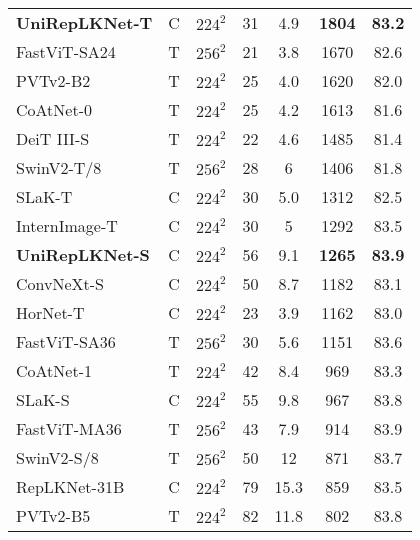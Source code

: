 \documentclass[10pt,twocolumn,letterpaper]{article}
\begin{document}
\begin{table}[t!]
\begin{tabular}{l|c|c|c|c|c|c}
    \textbf{UniRepLKNet-T}   &   C   &   $224^2$     &   31    &   4.9    &   \textbf{1804}   &   \textbf{83.2}    \\
    FastViT-SA24~\cite{vasu2023fastvit}      &   T   &   $256^2$   &   21    &   3.8    &   1670    &   82.6    \\
    PVTv2-B2~\cite{wang2022pvt} & T & $224^2$  & 25 & 4.0     &   1620    & 82.0 \\
    CoAtNet-0~\cite{dai2021coatnet} & T &$224^2$ & 25 & 4.2 &   1613& 81.6   \\
    DeiT III-S~\cite{touvron2022deit} & T &$224^2$  & 22 & 4.6  &   1485    &   81.4\\
    SwinV2-T/8~\cite{liu2022swin} & T &$256^2$ & 28 & 6   &   1406    & 81.8 \\
    SLaK-T~\cite{liu2022more} & C & $224^2$  & 30 & 5.0 & 1312 &82.5  \\
    InternImage-T~\cite{wang2023internimage}   & C     &$224^2$        & 30        & 5        &   1292   &    83.5 \\
    \hline
    \rowcolor{gray!20}
    \textbf{UniRepLKNet-S}   &   C   &   $224^2$     &   56    &   9.1    &   \textbf{1265}   &    \textbf{83.9}    \\
    ConvNeXt-S~\cite{liu2022convnet}  &   C   &   $224^2$     &   50  &   8.7 &   1182    &   83.1\\
    HorNet-T~\cite{rao2022hornet} & C & $224^2$ & 23 & 3.9 & 1162   &   83.0 \\
    FastViT-SA36~\cite{vasu2023fastvit}    &   T   &   $256^2$     &   30    &   5.6    &   1151    &   83.6     \\
    CoAtNet-1~\cite{dai2021coatnet} & T &$224^2$ & 42 & 8.4 &   969 & 83.3  \\
    SLaK-S~\cite{liu2022more} & C &$224^2$  & 55 & 9.8 & 967   &83.8 \\
    FastViT-MA36~\cite{vasu2023fastvit}    &   T   &   $256^2$     &   43    &   7.9    &   914     &   83.9    \\
    SwinV2-S/8~\cite{liu2022swin} & T &$256^2$ & 50 & 12  &   871     & 83.7\\
    RepLKNet-31B~\cite{ding2022scaling} & C &$224^2$  & 79 & 15.3 &    859 & 83.5\\
    PVTv2-B5~\cite{wang2022pvt} & T & $224^2$  & 82 & 11.8    &   802     & 83.8 \\
    
    \hline
    \hline


\end{tabular}
\end{table}
\end{document}
